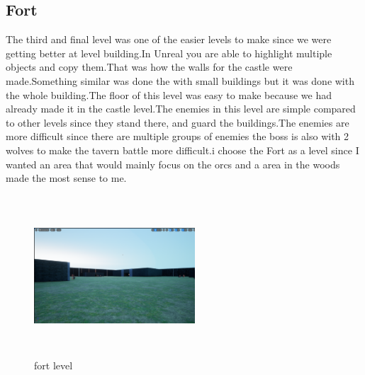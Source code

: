 \documentclass{sigchi}
\begin{document}
\subsection{Fort}
The third and final level was one of the easier levels to make since we were getting better at level building.In Unreal you are able to highlight multiple objects and copy them.That was how the walls for the castle were made.Something similar was done the with small buildings but it was done with the whole building.The floor of this level was easy to make because we had already made it in the castle level.The enemies in this level are simple compared to other levels since they stand there, and guard the buildings.The enemies are more difficult since there are multiple groups of enemies the boss is also with 2 wolves to make the tavern battle more difficult.i choose the Fort as a level since I wanted an area that would mainly focus on the orcs and a area in the woods made the most sense to me.
\begin{figure}


\includegraphics[width=6cm, height=6cm]{Figure/fort.png}  
\caption{fort level}
\end{figure}
\end{document}
